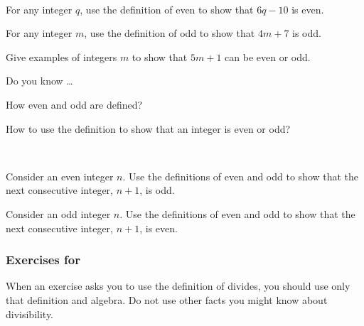 \begin{exer}[\exerU] %
\label{exer_linears_even_odd}
~  
    \begin{exerpart}
        \item \label{part_6qminus10_is_even} For any integer $q$, use the definition of even to show that $6q-10$ is even. 
        \item For any integer $m$, use the definition of odd to show that $4m+7$ is odd. %
        \item Give examples of integers $m$ to show that $5m+1$ can be even or odd.  
    \end{exerpart}
\end{exer}

\begin{exer}[\exerR] %
\label{exer_dyk_even_odd}
    Do you know \ldots
        \begin{exerpart}
            \item How even and odd are defined?
            \item How to use the definition to show that an integer is even or odd?
        \end{exerpart}
\end{exer}

\begin{exer}[\exerE] %
\label{exer_prove_consecutive_even_odd}  
~
    \begin{exerpart}
        \item Consider an even integer $n$.  Use the definitions of even and odd to show that the next consecutive integer, $n+1$, is odd.
        \item Consider an odd integer $n$.  Use the definitions of even and odd to show that the next consecutive integer, $n+1$, is even.
    \end{exerpart}
\end{exer}


\subsubsection*{Exercises for  \subdivides}

When an exercise asks you to use the definition of divides, you should use only that definition and algebra.  Do not use other facts you might know about divisibility. 

